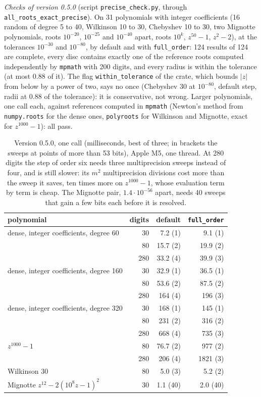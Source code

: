 \documentclass[10pt,a4paper]{article}
\theoremstyle{definition}
\numberwithin{equation}{section}
\begin{document}
\emph{Checks of version 0.5.0} (script \texttt{precise\_check.py}, through \texttt{all\_roots\_exact\_precise}).
On 31 polynomials with integer coefficients (16 random of degree 5 to 40, Wilkinson 10 to 30, Chebyshev
10 to 30, two Mignotte polynomials, roots $10^{-20}$, $10^{-25}$ and $10^{-40}$ apart, roots $10^k$,
$z^{50}-1$, $z^2-2$), at the tolerances $10^{-30}$ and $10^{-80}$, by default and with
\texttt{full\_order}: 124 results of 124 are complete, every disc contains exactly one of the reference
roots computed independently by \texttt{mpmath} with 200 digits, and every radius is within the
tolerance (at most 0.88 of it). The flag \texttt{within\_tolerance} of the crate, which bounds $|z|$ from
below by a power of two, says no once (Chebyshev 30 at $10^{-80}$, default step, radii at 0.88 of the
tolerance): it is conservative, not wrong. Larger polynomials, one call each, against references
computed in \texttt{mpmath} (Newton's method from \texttt{numpy.roots} for the dense ones,
\texttt{polyroots} for Wilkinson and Mignotte, exact for $z^{1000}-1$): all pass.
\begin{table}[H]\centering\small
\begin{tabular}{lrrr}
\toprule
polynomial & digits & default & \texttt{full\_order}\\
\midrule
dense, integer coefficients, degree 60 & 30 & 7.2 (1) & 9.1 (1)\\
 & 80 & 15.7 (2) & 19.9 (2)\\
 & 280 & 33.2 (4) & 39.9 (3)\\
dense, integer coefficients, degree 160 & 30 & 32.9 (1) & 36.5 (1)\\
 & 80 & 53.6 (2) & 87.5 (2)\\
 & 280 & 164 (4) & 196 (3)\\
dense, integer coefficients, degree 320 & 30 & 168 (1) & 145 (1)\\
 & 80 & 231 (2) & 316 (2)\\
 & 280 & 668 (4) & 735 (3)\\
$z^{1000}-1$ & 80 & 76.7 (2) & 977 (2)\\
 & 280 & 206 (4) & 1821 (3)\\
Wilkinson 30 & 80 & 5.0 (3) & 5.2 (2)\\
Mignotte $z^{12}-2(10^8z-1)^2$ & 30 & 1.1 (40) & 2.0 (40)\\
\bottomrule
\end{tabular}
\caption{Version 0.5.0, one call (milliseconds, best of three; in brackets the sweeps at points of more
than 53 bits), Apple M5, one thread. At 280 digits the step of order six needs three multiprecision sweeps
instead of four, and is still slower: its $m^2$ multiprecision divisions cost more than the sweep it
saves, ten times more on $z^{1000}-1$, whose evaluation term by term is cheap. The Mignotte pair, $1.4\cdot10^{-56}$
apart, needs 40 sweeps that gain a few bits each before it is resolved.}\label{tab:precise}
\end{table}
\end{document}
